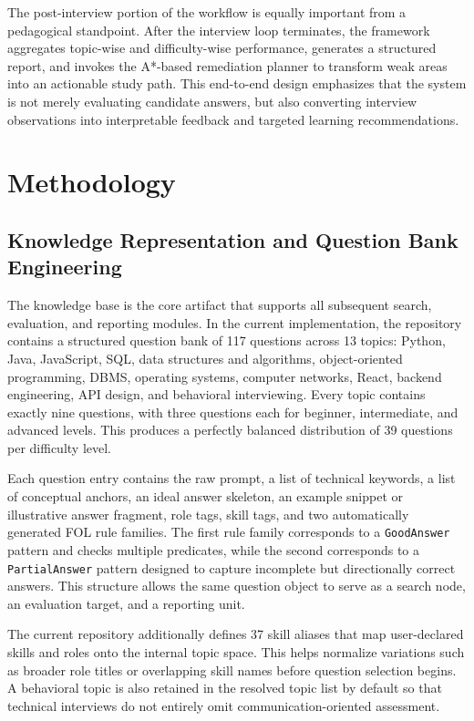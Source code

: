 \documentclass[conference]{IEEEtran}
\begin{document}
The post-interview portion of the workflow is equally important from a pedagogical standpoint. After the interview loop terminates, the framework aggregates topic-wise and difficulty-wise performance, generates a structured report, and invokes the A*-based remediation planner to transform weak areas into an actionable study path. This end-to-end design emphasizes that the system is not merely evaluating candidate answers, but also converting interview observations into interpretable feedback and targeted learning recommendations.

\section{Methodology}
\subsection{Knowledge Representation and Question Bank Engineering}
The knowledge base is the core artifact that supports all subsequent search, evaluation, and reporting modules. In the current implementation, the repository contains a structured question bank of 117 questions across 13 topics: Python, Java, JavaScript, SQL, data structures and algorithms, object-oriented programming, DBMS, operating systems, computer networks, React, backend engineering, API design, and behavioral interviewing. Every topic contains exactly nine questions, with three questions each for beginner, intermediate, and advanced levels. This produces a perfectly balanced distribution of 39 questions per difficulty level.

Each question entry contains the raw prompt, a list of technical keywords, a list of conceptual anchors, an ideal answer skeleton, an example snippet or illustrative answer fragment, role tags, skill tags, and two automatically generated FOL rule families. The first rule family corresponds to a \texttt{GoodAnswer} pattern and checks multiple predicates, while the second corresponds to a \texttt{PartialAnswer} pattern designed to capture incomplete but directionally correct answers. This structure allows the same question object to serve as a search node, an evaluation target, and a reporting unit.

The current repository additionally defines 37 skill aliases that map user-declared skills and roles onto the internal topic space. This helps normalize variations such as broader role titles or overlapping skill names before question selection begins. A behavioral topic is also retained in the resolved topic list by default so that technical interviews do not entirely omit communication-oriented assessment.
\end{document}

